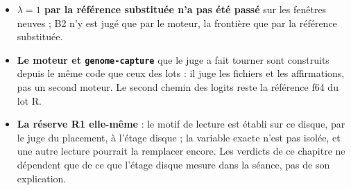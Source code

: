 \begin{faux}
\begin{itemize}
\item \textbf{$\lambda = 1$ par la référence substituée n'a pas été passé} sur les fenêtres neuves ; B2 n'y est jugé que par le moteur, la frontière que par la référence substituée.
\item \textbf{Le moteur et \texttt{genome-capture}} que le juge a fait tourner sont construits depuis le même code que ceux des lots : il juge les fichiers et les affirmations, pas un second moteur. Le second chemin des logits reste la référence f64 du lot R.
\item \textbf{La réserve R1 elle-même} : le motif de lecture est établi sur ce disque, par le juge du placement, à l'étage disque ; la variable exacte n'est pas isolée, et une autre lecture pourrait la remplacer encore. Les verdicts de ce chapitre ne dépendent que de ce que l'étage disque mesure dans la séance, pas de son explication.
\end{itemize}
\end{faux}
